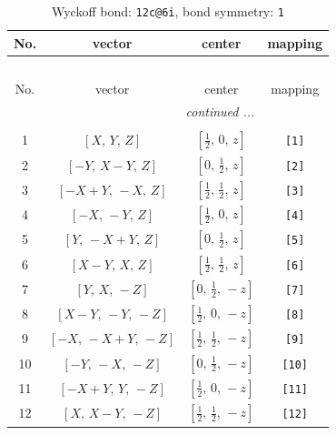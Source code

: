 \documentclass[fleqn,8pt]{jsarticle}
\begin{document}
\begin{longtable}{cccc}
\caption{Wyckoff bond: {\tt 12c@6i}, bond symmetry: {\tt 1}}
 \\
 \hline \hline
No. & vector & center & mapping \\ \hline \endfirsthead

\multicolumn{3}{l}{\tablename\ \thetable{}} \\
 \hline \hline
No. & vector & center & mapping \\ \hline \endhead

 \hline \hline
\multicolumn{3}{r}{\footnotesize\it continued ...} \\ \endfoot

 \hline \hline
\multicolumn{3}{r}{} \\ \endlastfoot

1 & $\left[ X,\, Y,\, Z \right]$ & $\left[ \frac{1}{2},\, 0,\, z \right]$ & {\tt [1]} \\ \hline
2 & $\left[ - Y,\, X - Y,\, Z \right]$ & $\left[ 0,\, \frac{1}{2},\, z \right]$ & {\tt [2]} \\ \hline
3 & $\left[ - X + Y,\, - X,\, Z \right]$ & $\left[ \frac{1}{2},\, \frac{1}{2},\, z \right]$ & {\tt [3]} \\ \hline
4 & $\left[ - X,\, - Y,\, Z \right]$ & $\left[ \frac{1}{2},\, 0,\, z \right]$ & {\tt [4]} \\ \hline
5 & $\left[ Y,\, - X + Y,\, Z \right]$ & $\left[ 0,\, \frac{1}{2},\, z \right]$ & {\tt [5]} \\ \hline
6 & $\left[ X - Y,\, X,\, Z \right]$ & $\left[ \frac{1}{2},\, \frac{1}{2},\, z \right]$ & {\tt [6]} \\ \hline
7 & $\left[ Y,\, X,\, - Z \right]$ & $\left[ 0,\, \frac{1}{2},\, - z \right]$ & {\tt [7]} \\ \hline
8 & $\left[ X - Y,\, - Y,\, - Z \right]$ & $\left[ \frac{1}{2},\, 0,\, - z \right]$ & {\tt [8]} \\ \hline
9 & $\left[ - X,\, - X + Y,\, - Z \right]$ & $\left[ \frac{1}{2},\, \frac{1}{2},\, - z \right]$ & {\tt [9]} \\ \hline
10 & $\left[ - Y,\, - X,\, - Z \right]$ & $\left[ 0,\, \frac{1}{2},\, - z \right]$ & {\tt [10]} \\ \hline
11 & $\left[ - X + Y,\, Y,\, - Z \right]$ & $\left[ \frac{1}{2},\, 0,\, - z \right]$ & {\tt [11]} \\ \hline
12 & $\left[ X,\, X - Y,\, - Z \right]$ & $\left[ \frac{1}{2},\, \frac{1}{2},\, - z \right]$ & {\tt [12]} \\
\end{longtable}
\end{document}
